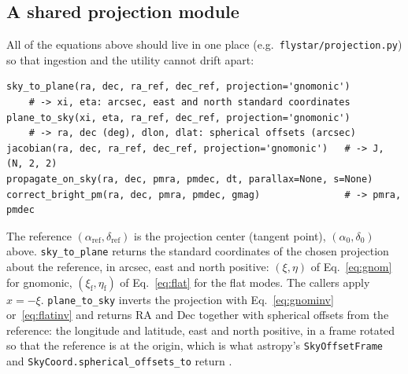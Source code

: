 \documentclass[11pt]{article}
\newcommand{\code}[1]{\texttt{#1}}
\begin{document}
\subsection{A shared projection module}

All of the equations above should live in one place (e.g.\ \code{flystar/projection.py})
so that ingestion and the utility cannot drift apart:
\begin{verbatim}
sky_to_plane(ra, dec, ra_ref, dec_ref, projection='gnomonic')
    # -> xi, eta: arcsec, east and north standard coordinates
plane_to_sky(xi, eta, ra_ref, dec_ref, projection='gnomonic')
    # -> ra, dec (deg), dlon, dlat: spherical offsets (arcsec)
jacobian(ra, dec, ra_ref, dec_ref, projection='gnomonic')   # -> J, (N, 2, 2)
propagate_on_sky(ra, dec, pmra, pmdec, dt, parallax=None, s=None)
correct_bright_pm(ra, dec, pmra, pmdec, gmag)               # -> pmra, pmdec
\end{verbatim}
The reference $(\alpha_\mathrm{ref},\delta_\mathrm{ref})$ is the projection
center (tangent point), $(\alpha_0,\delta_0)$ above.
\code{sky\_to\_plane} returns the standard coordinates of the chosen
projection about the reference, in arcsec, east and north positive: $(\xi,\eta)$
of Eq.~\eqref{eq:gnom} for gnomonic, $(\xi_\mathrm{f},\eta_\mathrm{f})$ of
Eq.~\eqref{eq:flat} for the flat modes. The callers apply $x = -\xi$.
\code{plane\_to\_sky} inverts the projection with Eq.~\eqref{eq:gnominv}
or~\eqref{eq:flatinv} and returns RA and Dec together with spherical offsets
from the reference: the longitude and latitude, east and north positive, in
a frame rotated so that the reference is at the origin, which is what
astropy's \code{SkyOffsetFrame} and \code{SkyCoord.spherical\_offsets\_to}
return \citep{Astropy2022}.
\end{document}
